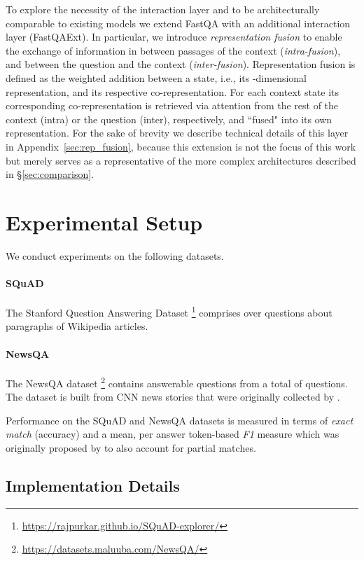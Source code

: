 \documentclass[11pt,a4paper]{article}
\begin{document}
To explore the necessity of the interaction layer and to be architecturally comparable to existing models we extend FastQA with an additional interaction layer (FastQAExt). In particular, we introduce \textit{representation fusion} to enable the exchange of information in between passages of the context (\textit{intra-fusion}), and between the question and the context (\textit{inter-fusion}). Representation fusion is defined as the weighted addition between a state, i.e., its -dimensional representation, and its respective co-representation. For each context state its corresponding co-representation is retrieved via attention from the rest of the context (intra) or the question (inter), respectively, and ``fused" into its own representation. For the sake of brevity we describe technical details of this layer in Appendix~\ref{sec:rep_fusion}, because this extension is not the focus of this work but merely serves as a representative of the more complex architectures described in \S\ref{sec:comparison}.

\section{Experimental Setup}

We conduct experiments on the following datasets.

\paragraph{SQuAD} The Stanford Question Answering Dataset \cite{Rajpurkar2016}\footnote{\url{https://rajpurkar.github.io/SQuAD-explorer/}} comprises over  questions about paragraphs of  Wikipedia articles.

\paragraph{NewsQA} The NewsQA dataset \cite{Trischler2017}\footnote{\url{https://datasets.maluuba.com/NewsQA/}} contains  answerable questions from a total of  questions. The dataset is built from CNN news stories that were originally collected by .

Performance on the SQuAD and NewsQA datasets is measured in terms of \textit{exact match} (accuracy) and a mean, per answer token-based \textit{F1} measure which was originally proposed by  to also account for partial matches.

\subsection{Implementation Details}
\end{document}
